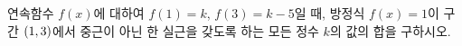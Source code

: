 연속함수 $f(x)$에 대하여 $f(1)=k$, $f(3)=k-5$일 때, 방정식 $f(x)=1$이 구간 $(1{,}\mkern3mu\mathopen{}3)$에서 중근이 아닌 한 실근을 갖도록 하는 모든 정수 $k$의 값의 합을 구하시오.
